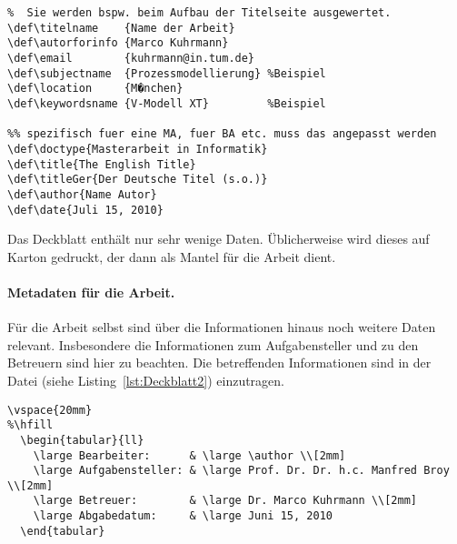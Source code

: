 
\begin{lstlisting}[captionpos=b, caption=Metadaten f\"ur das Deckblatt,label=lst:Deckblatt]
%% Einfache Definitionen von Konstanten für das gesamte Dokument.
%  Sie werden bspw. beim Aufbau der Titelseite ausgewertet.
\def\titelname    {Name der Arbeit}
\def\autorforinfo {Marco Kuhrmann}
\def\email        {kuhrmann@in.tum.de}
\def\subjectname  {Prozessmodellierung}	%Beispiel
\def\location     {M�nchen}
\def\keywordsname {V-Modell XT}			%Beispiel

%% spezifisch fuer eine MA, fuer BA etc. muss das angepasst werden
\def\doctype{Masterarbeit in Informatik}
\def\title{The English Title}
\def\titleGer{Der Deutsche Titel (s.o.)}
\def\author{Name Autor}
\def\date{Juli 15, 2010}
\end{lstlisting}

Das Deckblatt enth\"alt nur sehr wenige Daten. \"Ublicherweise wird dieses auf Karton gedruckt, der dann als Mantel f\"ur die Arbeit dient.

\paragraph{Metadaten f\"ur die Arbeit.}
F\"ur die Arbeit selbst sind \"uber die Informationen hinaus noch weitere Daten relevant. Insbesondere die Informationen zum Aufgabensteller und zu den Betreuern sind hier zu beachten. Die betreffenden Informationen sind in der Datei  (siehe Listing~\ref{lst:Deckblatt2}) einzutragen.

\begin{lstlisting}[captionpos=b, caption=Metadaten f\"ur das Deckblatt (innen),label=lst:Deckblatt2]
\vspace{20mm}
%\hfill
  \begin{tabular}{ll}
	\large Bearbeiter:      & \large \author \\[2mm]
	\large Aufgabensteller: & \large Prof. Dr. Dr. h.c. Manfred Broy \\[2mm]
	\large Betreuer:        & \large Dr. Marco Kuhrmann \\[2mm]
	\large Abgabedatum:     & \large Juni 15, 2010
  \end{tabular}
\end{lstlisting}

